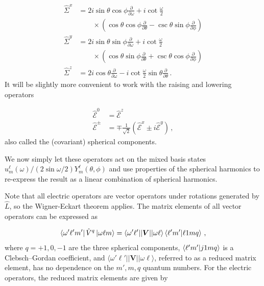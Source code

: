 \documentclass[reprint,superscriptaddress,pra,nofootinbib,preprintnumbers,floatfix]{revtex4-1}
\begin{document}
\begin{align}
\label{eq:Sigmaop}
    \hat \Sigma^x &= 2i \sin\theta \cos\phi \frac{\partial}{{\partial} \omega} + i \cot\frac{\omega}{2} \nonumber\\
    & \qquad \times \left(\cos\theta \cos\phi \frac{\partial}{{\partial} \theta} - \csc\theta \sin\phi \frac{\partial}{{\partial} \phi}\right)
    \nonumber\\
    \hat \Sigma^y &= 2i \sin\theta \sin\phi \frac{\partial}{{\partial} \omega} + i \cot\frac{\omega}{2} \nonumber\\
    & \qquad  \times\left(\cos\theta \sin\phi \frac{\partial}{{\partial} \theta} + \csc\theta \cos\phi \frac{\partial}{{\partial} \phi}\right)
    \nonumber\\
    \hat \Sigma^z &= 2i \cos\theta \frac{\partial}{{\partial} \omega}- i \cot\frac{\omega}{2}\sin\theta \frac{\partial}{{\partial} \theta}
    \,.
\end{align}
%
It will be slightly more convenient to work with the raising and lowering operators
%

\begin{align}
    \hat{\mathcal{E}}^0 &= \hat{\mathcal{E}}^z \\
    \hat{\mathcal{E}} ^{\pm} &= \mp \frac{1}{\sqrt{2}} \left( \hat{\mathcal{E}}^x  \pm i \hat{\mathcal{E}}^y  \right)
    \,,
\end{align}
also called the (covariant) spherical components. 
%


We now simply let these operators act on the mixed basis states $u^\ell_m(\omega) / (2 \sin\omega/2) Y^\ell_m(\theta,\phi)$ and use properties of the spherical harmonics to re-express the result as a linear combination of spherical harmonics.

Note that all electric operators are vector operators under rotations generated by $\hat L$, so the Wigner-Eckart theorem applies. 
%
The matrix elements of all vector operators can be expressed as
%

\begin{align}
\label{eq:vec_ops}
    \bra{\omega'\ell'm'}\hat V^q \ket{\omega \ell m} = \langle \omega'\ell' \vert \vert \bm{V} \vert\vert \omega \ell \rangle \bra{\ell' m'}\ket{\ell 1 m q}
    \,,
\end{align}
%
where $q=+1,0,-1$ are the three spherical components, $\bra{\ell' m'}\ket{j 1 m q}$ is a Clebsch–Gordan coefficient, and $\langle \omega'\ell' \vert \vert \bm{V} \vert\vert \omega \ell \rangle$, referred to as a reduced matrix element,  has no dependence on the $m',m, q$ quantum numbers.
%
For the electric operators, the reduced matrix elements are given by
\end{document}
